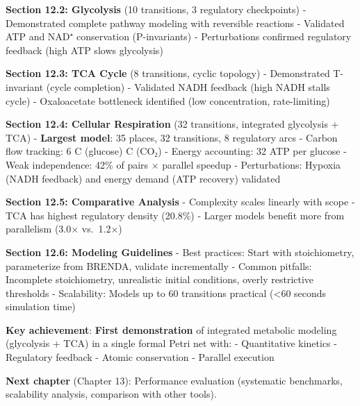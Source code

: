 \textbf{Section 12.2: Glycolysis} (10 transitions, 3 regulatory
checkpoints) - Demonstrated complete pathway modeling with reversible
reactions - Validated ATP and NAD⁺ conservation (P-invariants) -
Perturbations confirmed regulatory feedback (high ATP slows glycolysis)

\textbf{Section 12.3: TCA Cycle} (8 transitions, cyclic topology) -
Demonstrated T-invariant (cycle completion) - Validated NADH feedback
(high NADH stalls cycle) - Oxaloacetate bottleneck identified (low
concentration, rate-limiting)

\textbf{Section 12.4: Cellular Respiration} (32 transitions, integrated
glycolysis + TCA) - \textbf{Largest model}: 35 places, 32 transitions, 8
regulatory arcs - Carbon flow tracking: 6 C (glucose)  C (CO₂) \checkmark -
Energy accounting: 32 ATP per glucose \checkmark - Weak independence: 42\% of
pairs × parallel speedup - Perturbations: Hypoxia (NADH feedback)
and energy demand (ATP recovery) validated

\textbf{Section 12.5: Comparative Analysis} - Complexity scales linearly
with scope - TCA has highest regulatory density (20.8\%) - Larger models
benefit more from parallelism (3.0× vs.~1.2×)

\textbf{Section 12.6: Modeling Guidelines} - Best practices: Start with
stoichiometry, parameterize from BRENDA, validate incrementally - Common
pitfalls: Incomplete stoichiometry, unrealistic initial conditions,
overly restrictive thresholds - Scalability: Models up to 60 transitions
practical (\textless60 seconds simulation time)

\textbf{Key achievement}: \textbf{First demonstration} of integrated
metabolic modeling (glycolysis + TCA) in a single formal Petri net with:
- Quantitative kinetics - Regulatory feedback - Atomic conservation -
Parallel execution

\textbf{Next chapter} (Chapter 13): Performance evaluation (systematic
benchmarks, scalability analysis, comparison with other tools).
